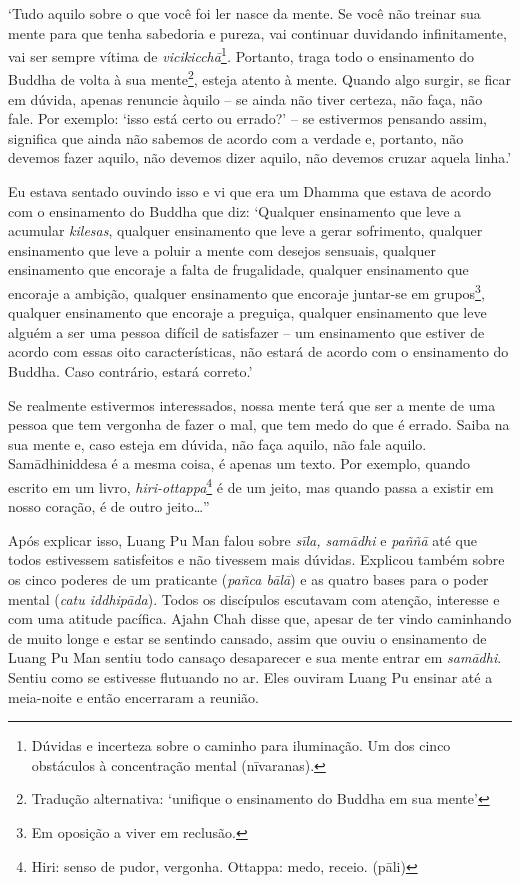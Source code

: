 `Tudo aquilo sobre o que você foi ler nasce da mente. Se você não
treinar sua mente para que tenha sabedoria e pureza, vai continuar
duvidando infinitamente, vai ser sempre vítima de
\emph{vicikicchā}\footnote{Dúvidas e incerteza sobre o caminho para
  iluminação. Um dos cinco obstáculos à concentração mental (nīvaranas).}\emph{.}
Portanto, traga todo o ensinamento do Buddha de volta à sua
mente\footnote{Tradução alternativa: `unifique o ensinamento do Buddha
  em sua mente'}, esteja atento à mente. Quando algo surgir, se ficar em
dúvida, apenas renuncie àquilo -- se ainda não tiver certeza, não faça,
não fale. Por exemplo: `isso está certo ou errado?' -- se estivermos
pensando assim, significa que ainda não sabemos de acordo com a verdade
e, portanto, não devemos fazer aquilo, não devemos dizer aquilo, não
devemos cruzar aquela linha.'

Eu estava sentado ouvindo isso e vi que era um Dhamma que estava de
acordo com o ensinamento do Buddha que diz: `Qualquer ensinamento que
leve a acumular \emph{kilesas}, qualquer ensinamento que leve a gerar
sofrimento, qualquer ensinamento que leve a poluir a mente com desejos
sensuais, qualquer ensinamento que encoraje a falta de frugalidade,
qualquer ensinamento que encoraje a ambição, qualquer ensinamento que
encoraje juntar-se em grupos\footnote{Em oposição a viver em reclusão.},
qualquer ensinamento que encoraje a preguiça, qualquer ensinamento que
leve alguém a ser uma pessoa difícil de satisfazer -- um ensinamento que
estiver de acordo com essas oito características, não estará de acordo
com o ensinamento do Buddha. Caso contrário, estará correto.'

Se realmente estivermos interessados, nossa mente terá que ser a mente
de uma pessoa que tem vergonha de fazer o mal, que tem medo do que é
errado. Saiba na sua mente e, caso esteja em dúvida, não faça aquilo,
não fale aquilo. Samādhiniddesa é a mesma coisa, é apenas um texto. Por
exemplo, quando escrito em um livro, \emph{hiri-ottappa}\footnote{Hiri:
  senso de pudor, vergonha. Ottappa: medo, receio. (pāli)} é de um
jeito, mas quando passa a existir em nosso coração, é de outro
jeito\ldots{}''

Após explicar isso, Luang Pu Man falou sobre \emph{sīla, samādhi} e
\emph{paññā} até que todos estivessem satisfeitos e não tivessem mais
dúvidas. Explicou também sobre os cinco poderes de um praticante
(\emph{pañca bālā}) e as quatro bases para o poder mental (\emph{catu
iddhipāda}). Todos os discípulos escutavam com atenção, interesse e com
uma atitude pacífica. Ajahn Chah disse que, apesar de ter vindo
caminhando de muito longe e estar se sentindo cansado, assim que ouviu o
ensinamento de Luang Pu Man sentiu todo cansaço desaparecer e sua mente
entrar em \emph{samādhi}. Sentiu como se estivesse flutuando no ar. Eles
ouviram Luang Pu ensinar até a meia-noite e então encerraram a reunião.

